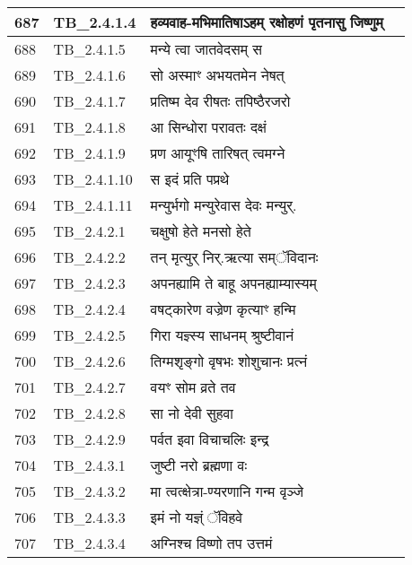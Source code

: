 \documentclass[17pt]{extarticle}
\begin{document}
\begin{longtable}{||p{0.4in}||p{0.9in}||p{4.0in}||p{0.9in}||}
        \hline
            687 & TB\_2.4.1.4 & हव्यवाह{-}मभिमातिषाऽहम् रक्षोहणं पृतनासु जिष्णुम् &      \\
        \hline
            688 & TB\_2.4.1.5 & मन्ये त्वा जातवेदसम् स &      \\
        \hline
            689 & TB\_2.4.1.6 & सो अस्माꣳ अभयतमेन नेषत् &      \\
        \hline
            690 & TB\_2.4.1.7 & प्रतिष्म देव रीषतः तपिष्ठैरजरो &      \\
        \hline
            691 & TB\_2.4.1.8 & आ सिन्धोरा परावतः दक्षं &      \\
        \hline
            692 & TB\_2.4.1.9 & प्रण आयूꣳषि तारिषत् त्वमग्ने &      \\
        \hline
            693 & TB\_2.4.1.10 & स इदं प्रति पप्रथे &      \\
        \hline
            694 & TB\_2.4.1.11 & मन्युर्भगो मन्युरेवास देवः मन्युर्. &      \\
        \hline
            695 & TB\_2.4.2.1 & चक्षुषो हेते मनसो हेते &      \\
        \hline
            696 & TB\_2.4.2.2 & तन् मृत्युर् निर्.ऋत्या सम्ॅविदानः &      \\
        \hline
            697 & TB\_2.4.2.3 & अपनह्यामि ते बाहू अपनह्याम्यास्यम् &      \\
        \hline
            698 & TB\_2.4.2.4 & वषट्कारेण वज्रेण कृत्याꣳ हन्मि &      \\
        \hline
            699 & TB\_2.4.2.5 & गिरा यज्ञ्स्य साधनम् श्रुष्टीवानं &      \\
        \hline
            700 & TB\_2.4.2.6 & तिग्मशृङ्गो वृषभः शोशुचानः प्रत्नं &      \\
        \hline
            701 & TB\_2.4.2.7 & वयꣳ सोम व्रते तव &      \\
        \hline
            702 & TB\_2.4.2.8 & सा नो देवी सुहवा &      \\
        \hline
            703 & TB\_2.4.2.9 & पर्वत इवा विचाचलिः इन्द्र &      \\
        \hline
            704 & TB\_2.4.3.1 & जुष्टी नरो ब्रह्मणा वः &      \\
        \hline
            705 & TB\_2.4.3.2 & मा त्वत्क्षेत्रा{-}ण्यरणानि गन्म वृञ्जे &      \\
        \hline
            706 & TB\_2.4.3.3 & इमं नो यज्ञ्ं ॅविहवे &      \\
        \hline
            707 & TB\_2.4.3.4 & अग्निश्च विष्णो तप उत्तमं &      \\

\end{longtable}
\end{document}
